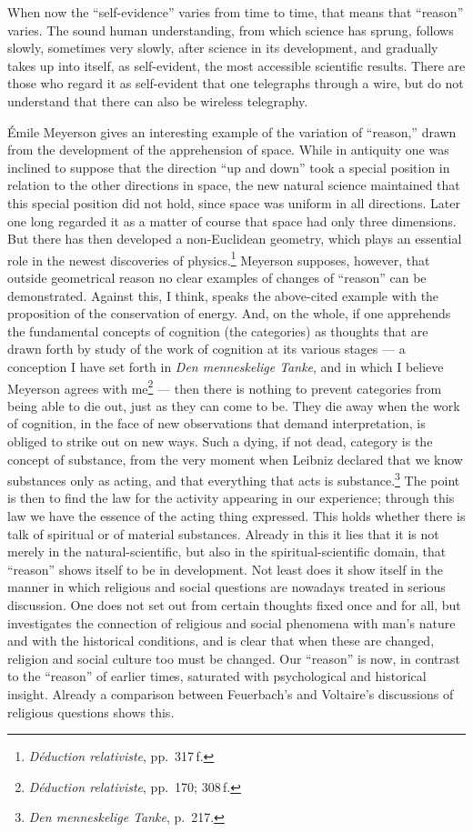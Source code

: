 \documentclass[12pt]{book}
\newcommand{\opage}[1]{\marginnote{\footnotesize\textit{[#1]}}}
\begin{document}
When now the ``self-evidence'' varies from time to time, that means that ``reason'' varies. The sound
human understanding, from which science has sprung, follows slowly, sometimes very slowly, after
science in its development, and gradually takes up into itself, as self-evident, the most accessible
scientific \opage{14}results. There are those who regard it as self-evident that one telegraphs through a wire,
but do not understand that there can also be wireless telegraphy.

Émile Meyerson gives an interesting example of the variation of ``reason,'' drawn from the development
of the apprehension of space. While in antiquity one was inclined to suppose that the direction ``up
and down'' took a special position in relation to the other directions in space, the new natural
science maintained that this special position did not hold, since space was uniform in all
directions. Later one long regarded it as a matter of course that space had only three dimensions.
But there has then developed a non-Euclidean geometry, which plays an essential role in the newest
discoveries of physics.\footnote{\textit{Déduction relativiste}, pp.\ 317\,f.} Meyerson supposes,
however, that outside geometrical reason no clear examples of changes of ``reason'' can be
demonstrated. Against this, I think, speaks the above-cited example with the proposition of the
conservation of energy. And, on the whole, if one apprehends the fundamental concepts of cognition
(the categories) as thoughts that are drawn forth by study of the work of cognition at its various
stages --- a conception I have set forth in \textit{Den menneskelige Tanke}, and in which I believe
Meyerson agrees with me\footnote{\textit{Déduction relativiste}, pp.\ 170; 308\,f.} --- then there is
nothing to prevent categories from being able to die out, just as they can come to be. They die away
when the work of cognition, in the face of new observations that demand interpretation, is obliged to
strike out on new ways. Such a dying, if not dead, category is the concept of substance, from the
very moment when Leibniz declared that we know substances only as acting, and that everything that
acts is \opage{15}substance.\footnote{\textit{Den menneskelige Tanke}, p.\ 217.} The point is then to find the
law for the activity appearing in our experience; through this law we have the essence of the acting
thing expressed. This holds whether there is talk of spiritual or of material substances. Already in
this it lies that it is not merely in the natural-scientific, but also in the spiritual-scientific
domain, that ``reason'' shows itself to be in development. Not least does it show itself in the manner
in which religious and social questions are nowadays treated in serious discussion. One does not set
out from certain thoughts fixed once and for all, but investigates the connection of religious and
social phenomena with man's nature and with the historical conditions, and is clear that when these
are changed, religion and social culture too must be changed. Our ``reason'' is now, in contrast to
the ``reason'' of earlier times, saturated with psychological and historical insight. Already a
comparison between Feuerbach's and Voltaire's discussions of religious questions shows this.
\end{document}

